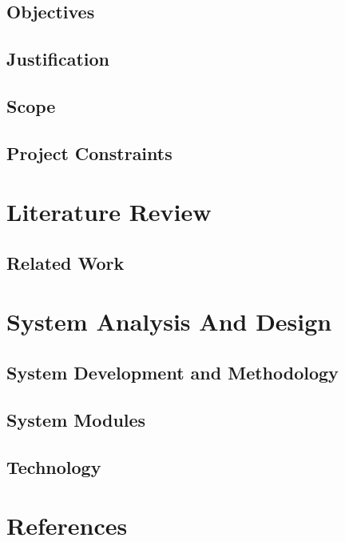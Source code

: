 \documentclass{report}
\begin{document}
\section{Objectives}


\section{Justification}


\section{Scope}


\section{Project Constraints}



\chapter{Literature Review}

\section{Related Work}


\chapter{System Analysis And Design}

\section{System Development and Methodology}


\section{System Modules}


\section{Technology}





\nocite{businessInsider}
\nocite{carpoolworld}

\chapter{References}


\end{document}
